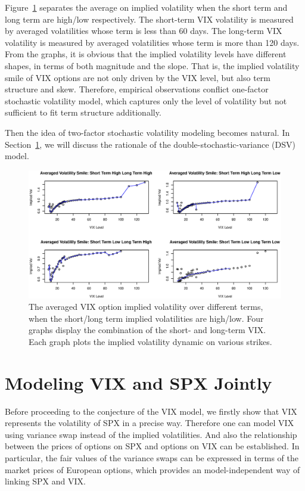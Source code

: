 \documentclass[11pt,reqno,final]{amsart}
\begin{document}
Figure~\ref{four_vix} separates the average on implied volatility when the short term and long term are high/low respectively. The short-term VIX volatility is measured by averaged volatilities whose term is less than 60 days. The long-term VIX volatility is measured by averaged volatilities whose term is more than 120 days. From the graphs, it is obvious that the implied volatility levels have different shapes, in terms of both magnitude and the slope. That is, the implied volatility smile of VIX options are not only driven by the VIX level, but also term structure and skew. Therefore, empirical observations conflict one-factor stochastic volatility model, which captures only the level of volatility but not sufficient to fit term structure additionally.

Then the idea of two-factor stochastic volatility modeling becomes natural. In Section~\ref{sec::vix_model}, we will discuss the rationale of the double-stochastic-variance (DSV) model.

\begin{figure}
  \centering
  \includegraphics[scale=0.6]{four_vix.eps}
  \caption{The averaged VIX option implied volatility over different terms, when the short/long term implied volatilities are high/low. Four graphs display the combination of the short- and long-term VIX. Each graph plots the implied volatility dynamic on various strikes.}\label{four_vix}
\end{figure}


\bigskip


\section{Modeling VIX and SPX Jointly} \label{sec::vix_model}
Before proceeding to the conjecture of the VIX model, we firstly show that VIX represents the volatility of SPX in a precise way. Therefore one can model VIX using variance swap instead of the implied volatilities. And also the relationship between the prices of options on SPX and options on VIX can be established. In particular, the fair values of the variance swaps can be expressed in terms of the market prices of European options, which provides an model-independent way of linking SPX and VIX.
\end{document}
